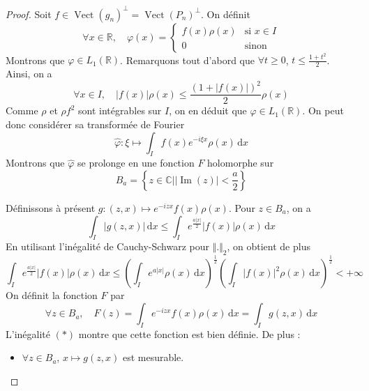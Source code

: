 	\begin{proof}
		Soit $f \in \operatorname{Vect}(g_n)^\perp = \operatorname{Vect}(P_n)^\perp$. On définit
		\[
		\forall x \in \mathbb{R}, \quad \varphi(x) = \begin{cases} f(x) \rho(x) &\text{si } x \in I \\ 0 &\text{sinon} \end{cases}
		\]
		Montrons que $\varphi \in L_1(\mathbb{R})$. Remarquons tout d'abord que $\forall t \geq 0$, $t \leq \frac{1 + t^2}{2}$. Ainsi, on a
		\[ \forall x \in I, \quad |f(x)|\rho(x) \leq \frac{(1 + |f(x)|)^2}{2} \rho(x) \]
		Comme $\rho$ et $\rho f^2$ sont intégrables sur $I$, on en déduit que $\varphi \in L_1(\mathbb{R})$. On peut donc considérer sa transformée de Fourier
		\[ \hat{\varphi} : \xi \mapsto \int_I f(x) e^{-i \xi x} \rho(x) \, \mathrm{d}x \]
		Montrons que $\hat{\varphi}$ se prolonge en une fonction $F$ holomorphe sur
		\[ B_a = \left\{ z \in \mathbb{C} \mid \vert \operatorname{Im}(z) \vert < \frac{a}{2} \right\} \]
		\begin{center}
		\end{center}
		Définissons à présent $g : (z, x) \mapsto e^{-izx} f(x) \rho(x)$. Pour $z \in B_a$, on a
		\[ \int_I \vert g(z, x) \vert \, \mathrm{d}x \leq \int_I e^{\frac{a \vert x \vert}{2}} \vert f(x) \vert \rho(x) \, \mathrm{d}x \]
		En utilisant l'inégalité de Cauchy-Schwarz pour $\Vert . \Vert_2$, on obtient de plus
		\[ \int_I e^{\frac{a \vert x \vert}{2}} \vert f(x) \vert \rho(x) \, \mathrm{d}x \leq \left( \int_I e^{a \vert x \vert} \rho(x) \, \mathrm{d}x \right)^{\frac{1}{2}} \left( \int_I \vert f(x) \vert^2 \rho(x) \, \mathrm{d}x \right)^{\frac{1}{2}} < + \infty \tag{$*$} \]
		On définit la fonction $F$ par
		\[ \forall z \in B_a , \quad F(z) = \int_I e^{-izx} f(x) \rho(x) \, \mathrm{d}x = \int_I g(z, x) \, \mathrm{d}x \]
		L'inégalité $(*)$ montre que cette fonction est bien définie. De plus :
		\begin{itemize}
			\item $\forall z \in B_a$, $x \mapsto g(z, x)$ est mesurable.

\end{itemize}
\end{proof}
